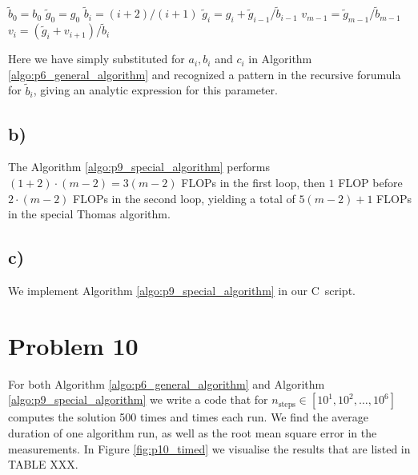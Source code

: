 \documentclass[english,notitlepage,nofootinbib]{revtex4-1}  %
\newcommand{\Fig}[1]{Figure \ref{fig:#1}}
\newcommand{\Algo}[1]{Algorithm \ref{algo:#1}}
\newcommand{\CC}{C\nolinebreak\hspace{-.05em}\raisebox{.4ex}{\tiny\bf +}\nolinebreak\hspace{-.10em}\raisebox{.4ex}{\tiny\bf +}}
\begin{document}
\begin{algorithm}[H]
    \caption{Special algorithm}\label{algo:p9_special_algorithm}
    \begin{algorithmic}
        \State $\tilde{b}_0 = b_0$ 
        \State $\tilde{g}_0 = g_0$
        \State $\tilde{b}_i = (i+2)/(i+1)$ 
        \State $\tilde{g}_i = g_i + \tilde{g}_{i-1} / \tilde{b}_{i-1}$
        \EndFor
        \State $v_{m-1} = \tilde{g}_{m-1} / \tilde{b}_{m-1}$
        \State $v_i = (\tilde{g}_i + v_{i+1} ) / \tilde{b}_i$ 
        \EndFor
    \end{algorithmic}
\end{algorithm}

Here we have simply substituted for $a_i, b_i$ and $c_i$ in \Algo{p6_general_algorithm} and recognized a pattern in the recursive forumula for $\tilde{b}_i$, giving an analytic expression for this parameter.


\subsection*{b)}

The \Algo{p9_special_algorithm} performs $(1+2)\cdot (m-2) = 3(m-2)$ FLOPs in the first loop, then $1$ FLOP before $2 \cdot (m-2)$ FLOPs in the second loop, yielding a total of $5(m-2)+1$ FLOPs in the special Thomas algorithm.

\subsection*{c)}

We implement \Algo{p9_special_algorithm} in our \CC\, script. 

\section*{Problem 10}

For both \Algo{p6_general_algorithm} and \Algo{p9_special_algorithm} we write a code that for $n_\text{steps}\in[10^{1}, 10^{2}, \dots, 10^{6}]$ computes the solution 500 times and times each run. We find the average duration of one algorithm run, as well as the root mean square error in the measurements. In \Fig{p10_timed} we visualise the results that are listed in TABLE XXX.

\begin{table}
    \caption{The mean $\mu$ and standard deviation $\sigma$ of time spent to execute the general and special Thomas algorithms}
    \label{tab:thomas_algo}  
    
\end{table}
\end{document}
